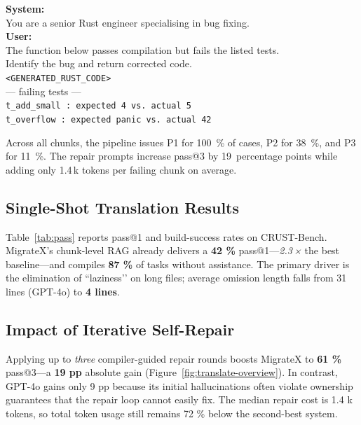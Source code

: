 \documentclass[twocolumn]{article}
\begin{document}
    \begin{tcolorbox}
    \small
    \textbf{System:}\\
    You are a senior Rust engineer specialising in bug fixing.\\[2pt]
    \textbf{User:}\\
    The function below passes compilation but fails the listed tests.\\
    Identify the bug and return corrected code.\\[6pt]
    \texttt{\textless GENERATED\_RUST\_CODE\textgreater}\\[4pt]
    --- failing tests ---\\
    \texttt{t\_add\_small :  expected 4  vs.\  actual 5}\\
    \texttt{t\_overflow  :  expected panic vs.\ actual 42}
    \end{tcolorbox}
    
    \bigskip
    Across all chunks, the pipeline issues P1 for 100~\% of cases, P2 for
    38~\%, and P3 for 11~\%.  The repair prompts increase pass@3 by
    19~percentage points while adding only 1.4\,k tokens per
    failing chunk on average.
    
    \subsection{Single-Shot Translation Results}
    \label{subsec:single}
    Table~\ref{tab:pass} reports pass@1 and build-success rates on CRUST-Bench.  
    MigrateX’s chunk-level RAG already delivers a \textbf{42 \%} pass@1—\textit{2.3\,×} the best baseline—and compiles \textbf{87 \%} of tasks without assistance.  
    The primary driver is the elimination of “laziness’’ on long files; average omission length falls from 31 lines (GPT-4o) to \textbf{4 lines}.  
    
    \subsection{Impact of Iterative Self-Repair}
    \label{subsec:repair}
    Applying up to \emph{three} compiler-guided repair rounds boosts MigrateX to \textbf{61 \%} pass@3—a
    \textbf{19 pp} absolute gain (Figure~\ref{fig:translate-overview}).  
    In contrast, GPT-4o gains only 9 pp because its initial hallucinations often violate ownership guarantees that the repair loop cannot easily fix.  
    The median repair cost is 1.4 k tokens, so total token usage still remains 72 \% below the second-best system.
    
\end{document}
